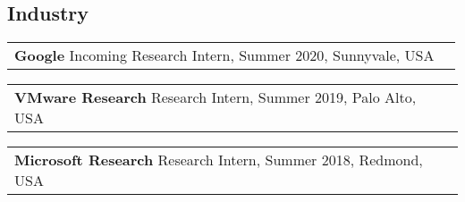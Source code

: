 \documentclass[margin,line]{res}
\begin{document}
\begin{resume}

\section{\sc Industry}

\begin{tabular}{@{}p{5.5in}p{4in}}
{\bf Google} \dotfill Incoming Research Intern, Summer 2020, Sunnyvale, USA\\
\end{tabular}

\vspace{-2.5pt}
\begin{tabular}{@{}p{5.5in}p{4in}}
{\bf VMware Research} \dotfill Research Intern, Summer 2019, Palo Alto, USA\\
\end{tabular}

\vspace{-2.5pt}
\begin{tabular}{@{}p{5.5in}p{4in}}
{\bf Microsoft Research} \dotfill Research Intern, Summer 2018, Redmond, USA\\
\end{tabular}


\end{resume}
\end{document}
